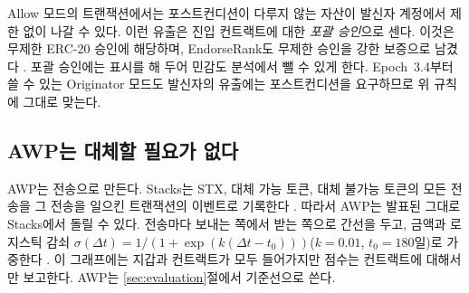 Allow 모드의 트랜잭션에서는 포스트컨디션이 다루지 않는 자산이 발신자 계정에서 제한 없이 나갈 수 있다. 이런 유출은 진입 컨트랙트에 대한 \emph{포괄 승인}으로 센다. 이것은 무제한 ERC-20 승인에 해당하며, EndorseRank도 무제한 승인을 강한 보증으로 남겼다 \cite{kwon2026endorserank}. 포괄 승인에는 표시를 해 두어 민감도 분석에서 뺄 수 있게 한다. Epoch~3.4부터 쓸 수 있는 Originator 모드도 발신자의 유출에는 포스트컨디션을 요구하므로 위 규칙에 그대로 맞는다.

\subsection{AWP는 대체할 필요가 없다}

AWP는 전송으로 만든다. Stacks는 STX, 대체 가능 토큰, 대체 불가능 토큰의 모든 전송을 그 전송을 일으킨 트랜잭션의 이벤트로 기록한다 \cite{hiroapi}. 따라서 AWP는 발표된 그대로 Stacks에서 돌릴 수 있다. 전송마다 보내는 쪽에서 받는 쪽으로 간선을 두고, 금액과 로지스틱 감쇠 $\sigma(\Delta t)=1/(1+\exp(k(\Delta t-t_0)))$($k=0.01$, $t_0=180$일)로 가중한다 \cite{do2023awp}. 이 그래프에는 지갑과 컨트랙트가 모두 들어가지만 점수는 컨트랙트에 대해서만 보고한다. AWP는 \ref{sec:evaluation}절에서 기준선으로 쓴다.
